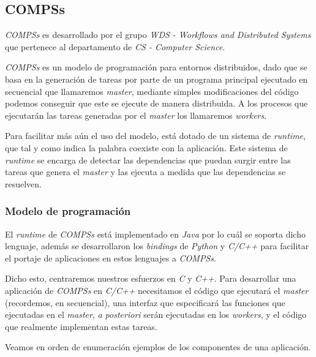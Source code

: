 \documentclass[a4paper]{article}
\begin{document}
\subsection{COMPSs}

\textit{COMPSs} es desarrollado por el grupo \textit{WDS - Workflows and Distributed Systems} que pertenece al departamento de \textit{CS - Computer Science}.
\par\bigskip

\textit{COMPSs} es un modelo de programación para entornos distribuidos\cite{badia2015comp}, dado que se basa en la generación de tareas por parte de un programa principal ejecutado en secuencial que llamaremos \textit{master}, mediante simples modificaciones del código podemos conseguir que este se ejecute de manera distribuida. A los procesos que ejecutarán las tareas generadas por el \textit{master} los llamaremos \textit{workers}.  \par\bigskip

Para facilitar más aún el uso del modelo, está dotado de un sistema de \textit{runtime}, que tal y como indica la palabra coexiste con la aplicación. Este sistema de \textit{runtime} se encarga de detectar las dependencias que puedan surgir entre las tareas que genera el \textit{master} y las ejecuta a medida que las dependencias se resuelven. 

\subsubsection{Modelo de programación} \label{compss_pm}

El \textit{runtime} de \textit{COMPSs} está implementado en \textit{Java} por lo cuál se soporta dicho lenguaje, además se desarrollaron los \textit{bindings} de \textit{Python} y \textit{C/C++} para facilitar el portaje de aplicaciones en estos lenguajes a \textit{COMPSs}. 
\par\bigskip

Dicho esto, centraremos nuestros esfuerzos en \textit{C} y \textit{C++}. Para desarrollar una aplicación de \textit{COMPSs} en \textit{C/C++} necesitamos el código que ejecutará el \textit{master} (recordemos, en secuencial), una interfaz que especificará las funciones que ejecutadas en el \textit{master}, \textit{a posteriori} serán ejecutadas en los \textit{workers}, y el código que realmente implementan estas tareas. 
\par\bigskip

Veamos en orden de enumeración ejemplos de los componentes de una aplicación.
\end{document}
